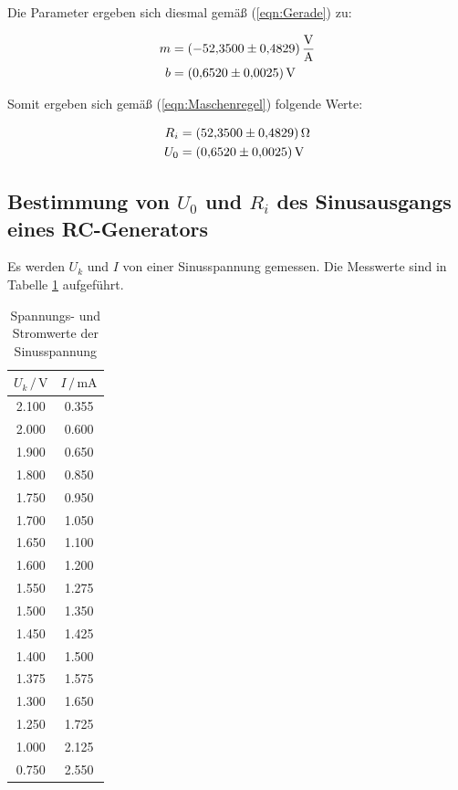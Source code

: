 Die Parameter ergeben sich diesmal gemäß (\ref{eqn:Gerade}) zu: 

\begin{align*}
m &= \SI{-52.350+-0.4829}{\volt\per\ampere}\\
b &= \SI{0.652+-0.0025}{\volt}
\end{align*}

Somit ergeben sich gemäß (\ref{eqn:Maschenregel}) folgende Werte:

\begin{align*}
R_i &= \SI{52.350+-0.4829}{\ohm}\\
U_0 &= \SI{0.652+-0.0025}{\volt}
\end{align*}

\subsection{Bestimmung von $U_0$ und $R_i$ des Sinusausgangs eines RC-Generators}

Es werden $U_k$ und $I$ von einer Sinusspannung gemessen. Die Messwerte
sind in Tabelle \ref{tab:Sinus} aufgeführt.

\begin{table}
   \centering
   \caption{Spannungs- und Stromwerte der Sinusspannung}
   \label{tab:Sinus}
   \begin{tabular}{c c}
     \toprule
      $U_k \,/\, \si{\volt}$ & $I \,/\, \si{\milli\ampere}$\\
     \midrule
       2.100 & 0.355\\
       2.000 & 0.600\\
       1.900 & 0.650\\
       1.800 & 0.850\\
       1.750 & 0.950\\
       1.700 & 1.050\\
       1.650 & 1.100\\
       1.600 & 1.200\\
       1.550 & 1.275\\
       1.500 & 1.350\\
       1.450 & 1.425\\
       1.400 & 1.500\\
       1.375 & 1.575\\
       1.300 & 1.650\\
       1.250 & 1.725\\
       1.000 & 2.125\\
       0.750 & 2.550\\
     \bottomrule
   \end{tabular}
 \end{table}

